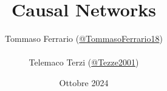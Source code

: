 \documentclass[a4paper, oneside]{book}
\title{Causal Networks}
\author{Tommaso Ferrario (\href{https://github.com/TommasoFerrario18}{@TommasoFerrario18})\\\\
Telemaco Terzi (\href{https://github.com/Tezze2001}{@Tezze2001})}
\date{Ottobre 2024}
\begin{document}
\maketitle
\newtheorem{teorema}{Teorema}
\newtheorem{dimostrazione}{Dimostrazione}
\newtheorem{definition}{Definition}
\newtheorem{esempio}{Esempio}
\newtheorem{osservazione}{Osservazione}
\newtheorem{note}{Note}
\newtheorem{corollario}{Corollario}
\tableofcontents
\renewcommand{\chaptermark}[1]{
    \markboth{\chaptername
        \ \thechapter.\ #1}{}}
\renewcommand{\sectionmark}[1]{\markright{\thesection.\ #1}}









\end{document}
